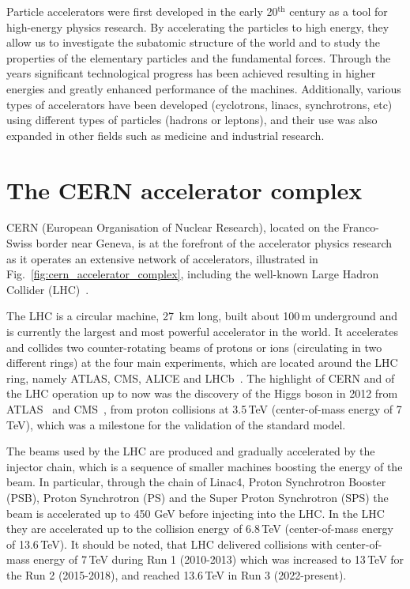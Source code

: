 Particle accelerators were first developed in the early 20$^\mathrm{th}$ century as a tool for high-energy physics research. By accelerating the particles to high energy, they allow us to investigate the subatomic structure of the world and to study the properties of the elementary particles and the fundamental forces. Through the years significant technological progress has been achieved resulting in higher energies and greatly enhanced performance of the machines. Additionally, various types of accelerators have been developed (cyclotrons, linacs, synchrotrons, etc) using different types of particles (hadrons or leptons), and their use was also expanded in other fields such as medicine and industrial research. 



\section{The CERN accelerator complex}

CERN (European Organisation of Nuclear Research), located on the Franco-Swiss border near Geneva, is at the forefront of the accelerator physics research as it operates an extensive network of accelerators, illustrated in Fig.~\ref{fig:cern_accelerator_complex}, including the well-known Large Hadron Collider (LHC)~\cite{Brüning:782076}.

The LHC is a circular machine, 27\, km long, built about 100\,m underground and is currently the largest and most powerful accelerator in the world. It accelerates and collides two counter-rotating beams of protons or ions (circulating in two different rings) at the four main experiments, which are located around the LHC ring, namely ATLAS, CMS, ALICE and LHCb~\cite{ATLAS:2008xda, CMS:2008xjf, ALICE:2008ngc, Alves:1129809}. The highlight of CERN and of the LHC operation up to now was the discovery of the Higgs boson in 2012 from ATLAS~\cite{ATLAS_Higgs} and CMS~\cite{CMS_Higgs}, from proton collisions at 3.5\,TeV (center-of-mass energy of 7\,TeV), which was a milestone for the validation of the standard model. %

The beams used by the LHC are produced and gradually accelerated by the injector chain, which is a sequence of smaller machines boosting the energy of the beam. In particular, through the chain of Linac4, Proton Synchrotron Booster (PSB), Proton Synchrotron (PS) and the Super Proton Synchrotron (SPS) the beam is accelerated up to 450 GeV before injecting into the LHC. In the LHC they are accelerated up to the collision energy of 6.8\,TeV (center-of-mass energy of 13.6\,TeV). It should be noted, that LHC delivered collisions with center-of-mass energy of 7\,TeV during Run 1 (2010-2013) which was increased to 13\,TeV for the Run 2 (2015-2018), and reached 13.6\,TeV in Run 3 (2022-present). 

